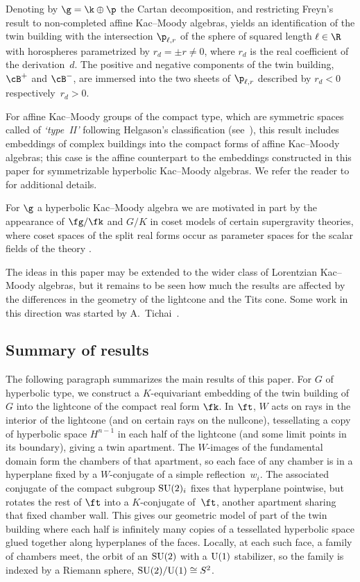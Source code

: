 Denoting by $\g=\k \oplus \p$ the Cartan decomposition, and restricting Freyn's result to non-completed affine Kac--Moody algebras, yields an identification of the twin building with the intersection $\p_{\ell, r}$ of the sphere of squared length $\ell\in \R$ with horospheres parametrized by $r_d=\pm r\not=0$, where $r_d$ is the real coefficient of the derivation~$d$. The positive and negative components of the twin building, $\cB^+$ and $\cB^-$, are immersed into the two sheets of $\p_{\ell, r}$ described by $r_d<0$ respectively~$r_d>0$.

For affine Kac--Moody groups of the compact type, which are symmetric spaces called of \emph{`type~II'} following Helgason's classification (see~\cite{Freyn15, Helgason01}), this result includes embeddings of complex buildings into the compact forms of affine Kac--Moody algebras; this case is the affine counterpart to the embeddings constructed in this paper for symmetrizable hyperbolic Kac--Moody algebras. We refer the reader to~\cite{Freyn09, Freyn10b, Freyn10a, Freyn10d} for additional details.

For $\g$ a hyperbolic Kac--Moody algebra we are motivated in part by the appearance of $\fg/\fk$ and $G/K$ in coset models of certain supergravity theories, where coset spaces of the split real forms occur as parameter spaces for the scalar fields of the theory \cite{DamourHenneauxNicolai02,Julia85, West01}.

The ideas in this paper may be extended to the wider class of Lorentzian Kac--Moody algebras, but it remains to be seen how much the results are affected by the differences in the geometry of the lightcone and the Tits cone. Some work in this direction was started by A.~Tichai~\cite{Tich14}.

\subsection{Summary of results}\label{subsection:Summary of results}

The following paragraph summarizes the main results of this paper.
For $G$ of hyperbolic type, we construct a $K$-equivariant embedding of the twin building of $G$ into the lightcone of the compact
real form $\fk$. In $\ft$, $W$ acts on rays in the interior of the lightcone (and on certain rays on the nullcone), tessellating a copy of
hyperbolic space $H^{n-1}$ in each half of the lightcone (and some limit points in its boundary), giving a twin apartment. The $W$-images of the fundamental domain form the chambers of that apartment, so each face of any chamber is in a hyperplane fixed by a $W$-conjugate of a simple reflection~$w_i$. The associated conjugate of the compact subgroup ${\rm SU}(2)_i$ fixes that hyperplane pointwise, but rotates the rest of $\ft$ into a $K$-conjugate of~$\ft$, another apartment sharing that fixed chamber wall.
This gives our geometric model of part of the twin building where each half is infinitely many copies of a tessellated hyperbolic space glued together along hyperplanes of the faces. Locally, at each such face, a family of chambers meet, the orbit of an ${\rm SU}(2)$ with a ${\rm U}(1)$ stabilizer, so the family is indexed by a Riemann sphere, ${\rm SU}(2)/{\rm U}(1) \cong S^2$.
